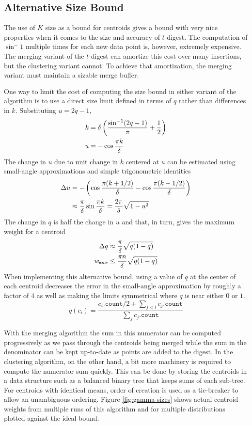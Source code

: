 \documentclass[11pt]{amsart}
\begin{document}
\subsection{Alternative Size Bound}
The use of $K$ size as a bound for centroids gives a bound with very nice properties when it comes to the size and accuracy of $t$-digest. The computation of $\sin^-1$ multiple times for each new data point is, however, extremely expensive. The merging variant of the $t$-digest can amortize this cost over many insertions, but the clustering variant cannot. To achieve that amortization, the merging variant must maintain a sizable merge buffer.

One way to limit the cost of computing the size bound in either variant of the algorithm is to use a direct size limit defined in terms of $q$ rather than differences in $k$. Substituting $u=2q-1$,
\[
\begin{aligned}
k &= \delta \left( {\sin^{-1}(2q-1) \over \pi} + {1 \over 2} \right ) \\
u &= - \cos {\pi k \over \delta} \\
\end{aligned}
\]
The change in $u$ due to unit change in $k$ centered at $u$ can be estimated using small-angle approximations and simple trigonometric identities
\[
\begin{aligned}
\Delta u &= -\left( \cos {\pi (k+1/2) \over \delta} - \cos {\pi (k-1/2) \over \delta} \right) \\
 &\approx    {\pi \over \delta}\sin {\pi k \over \delta}    =    {2\pi \over \delta} \sqrt {1-u^2} \\
\end{aligned}
\]
The change in $q$ is half the change in $u$ and that, in turn, gives the maximum weight for a centroid
\[
\begin{aligned}
 \Delta q &\approx { \pi \over \delta} \sqrt {q (1-q)}   \\
w_{\mathtt max} &\le  { \pi n \over \delta} \sqrt {q (1-q)}   
\end{aligned}
\]
When implementing this alternative bound, using a value of $q$ at the center of each centroid decreases the error in the small-angle approximation by roughly a factor of 4 as well as making the limits symmetrical where $q$ is near either $0$ or $1$.
\[q(c_i)=\frac{c_i.\mathtt{count}/2 + \sum_{j<i}c_j.\mathtt{count}} {\sum_j c_j.\mathtt{count}}\]

With the merging algorithm the sum in this numerator can be computed progressively as we pass through the centroids being merged while the sum in the denominator can be kept up-to-date as points are added to the digest. In the clustering algorithm, on the other hand, a bit more machinery is required to compute the numerator sum quickly. This can be done by storing the centroids in a data structure such as a balanced binary tree that keeps sums of each sub-tree.  For centroids with identical means, order of creation is used as a tie-breaker to allow an unambiguous ordering.  Figure \ref{fig:gamma-sizes} shows actual centroid weights from multiple runs of this algorithm and for multiple distributions plotted against the ideal bound.
\end{document}
